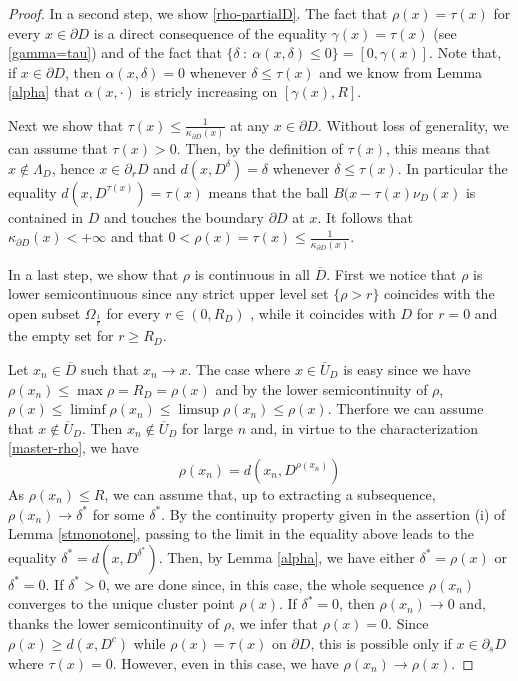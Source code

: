 \documentclass[reqno,11pt]{amsart}
\theoremstyle{definition}
\numberwithin{equation}{section}
\def\ov{\overline}
\newcommand{\1}{{{\bf 1}\kern-0,28em\rm l}}
\begin{document}
\begin{proof}
\medskip
In a second step,  we show \eqref{rho-partialD}. The fact that $\rho(x)=\tau(x)$ for every  $x\in \partial D$ is a direct consequence of the equality
$\gamma(x)=\tau(x)$ (see \eqref{gamma=tau}) and of the fact that $\{\delta \ :\  \alpha(x,\delta) \le 0 \} = [0,\gamma(x)]$.
Note that, if $x\in \partial D$, then $ \alpha(x,\delta)= 0$ whenever $\delta\le \tau(x)$ and we know from Lemma \eqref{alpha} that $\alpha(x,\cdot)$ is stricly increasing on $[\gamma(x), R]$.

 Next we  show  that $\tau(x) \le  \frac{1}{\kappa_{\partial D}(x)} $  at any $x\in \partial D$. Without loss of generality, we can assume that
 $\tau(x)>0$.  Then, by the definition of $\tau(x)$, this means that $x\notin \Lambda_D$, hence $x\in \partial_r D$ and $d(x, D^\delta) = \delta$ whenever $\delta\le \tau(x)$. In particular the equality $d(x, D^{\tau(x)})= \tau(x)$ means that the ball $B(x -\tau(x) \nu_D(x)$ is contained in $D$ and touches the boundary $\partial D$ at $x$. It follows that $\kappa_{\partial D}(x)<+\infty$ and that  $0< \rho(x)=\tau(x) \le \frac{1}{\kappa_{\partial D}(x)}$. 
 
\medskip
 In a last step, we show that $\rho$ is continuous in all $\ov D$. First we notice that $\rho$ is lower semicontinuous since any strict upper level set 
 $\{\rho > r\}$ coincides with the open subset $\Omega_{\frac1{r}}$ for every $r\in (0,R_D)$ , while it coincides with $D$ for $r=0$ and the empty set for $r\ge R_D$.
 
 \medskip
 Let $x_n\in \ov D$ such that $x_n\to x$. The case where $x\in \ov U_D$ is easy since we have $\rho(x_n)\le \max \rho= R_D= \rho(x)$ and
 by the lower semicontinuity of $\rho$, $ \rho(x) \le \liminf \rho(x_n) \le \limsup \rho(x_n) \le \rho(x)$.
 Therfore we can  assume that $x\notin \ov U_D$.   Then  $x_n \notin \ov U_D$ for large $n$ and,  
 in virtue to the characterization \eqref{master-rho}, we have 
$$\rho(x_n) =d(x_n, D^{\rho(x_n)}) $$
 As $\rho(x_n) \le R$, we can assume that, up to extracting a subsequence,  $\rho(x_n) \to \delta^*$  for some $\delta^*$. 
  By the continuity property given in the assertion (i) of  Lemma \ref{stmonotone}, passing to the limit in the equality above leads to the equality
   $\delta^* =d(x, D^{\delta^*})$. Then, by Lemma \ref{alpha}, we have either $\delta^*= \rho(x)$ or $\delta^*=0$. 
   If $\delta^*>0$, we are done since, in this case, the whole sequence $\rho(x_n)$ converges to the unique cluster point $\rho(x)$.
   If $\delta^*=0$, then $\rho(x_n)\to 0$ and, thanks the lower semicontinuity of $\rho$, we infer that $\rho(x)=0$. Since $\rho(x) \ge d(x,D^c)$ while
    $\rho(x)=\tau(x)$ on $\partial D$, this is possible only if $x\in \partial_s D$ where $\tau(x)=0$. However, even in this case, we have $\rho(x_n) \to \rho(x)$.
  
 \end{proof}
 
\end{document}
